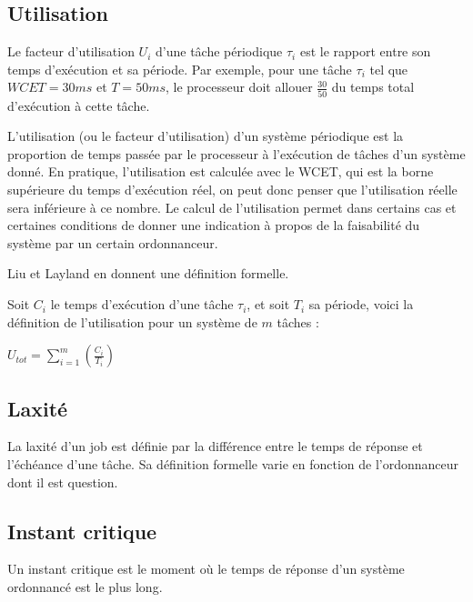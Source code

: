 \documentclass[11pt,a4paper,oneside]{report}
\begin{document}
	\subsection{Utilisation}
	Le facteur d'utilisation $U_i$ d'une tâche périodique $\tau_i$ est le rapport entre 
	son temps d'exécution et sa période. Par exemple, pour une tâche $\tau_i$ tel que 
	$WCET = 30 ms$ et $T = 50 ms$, le processeur doit allouer $\frac{30}{50}$ du temps 
	total d'exécution à cette tâche.\medskip
	
	L'utilisation (ou le facteur d'utilisation) d'un système périodique est la proportion de temps 
	passée par le processeur à l'exécution de tâches d'un système donné. En pratique, l'utilisation 
	est calculée avec le WCET, qui est la borne supérieure du temps d'exécution réel, on 
	peut donc penser que l'utilisation réelle sera inférieure à ce nombre.
	Le calcul de l'utilisation permet dans certains cas et certaines conditions de donner une indication 
	à propos de la faisabilité du système par un certain ordonnanceur. 
	\medskip
	
	Liu et Layland \cite{liu_scheduling_1973} en donnent une définition formelle.\medskip 
	
	Soit $C_i$ le temps d'exécution d'une tâche $\tau_i$, et soit $T_i$ sa période, voici la définition de 
	l'utilisation pour un système de $m$ tâches :\medskip
	\begin{center}
		$U_{tot} = \sum_{i = 1}^{m}(\frac{C_i}{T_i})$
	\end{center}
	
	\subsection{Laxité}
	\label{laxite}
	La laxité d'un job est définie par la différence entre le temps de réponse et l'échéance 
	d'une tâche. Sa définition formelle varie en fonction de l'ordonnanceur dont il est question.
	
	\subsection{Instant critique}
	\label{instantcritique}
	Un instant critique est le moment où le temps de réponse d'un système ordonnancé est le plus long.
	
	
\end{document}
